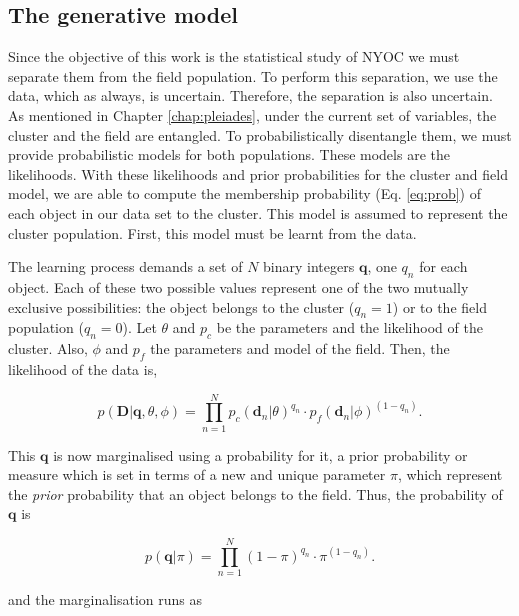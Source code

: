 \subsection{The generative model}
\label{subsect:generative-model}
Since the objective of this work is the statistical study of NYOC we must separate them from the field population. To perform this separation, we use the data, which as always, is uncertain. Therefore, the separation is also uncertain. As mentioned in Chapter \ref{chap:pleiades}, under the current set of variables, the cluster and the field are entangled. To probabilistically disentangle them, we must provide probabilistic models for both populations. These models are the likelihoods. With these likelihoods and prior probabilities for the cluster and field model, we are able to compute the membership probability (Eq. \ref{eq:prob}) of each object in our data set to the cluster. This model is assumed to represent the cluster population. First, this model must be learnt from the data.  

The learning process demands a set of $N$ binary integers $\mathbf{q}$, one $q_n$ for each object. Each of these two possible values represent one of the two mutually exclusive possibilities: the object belongs to the cluster ($q_n=1$) or to the field population ($q_n=0$). Let $\theta$ and $p_c$ be the parameters and the likelihood of the cluster. Also, $\phi$ and $p_f$ the parameters and model of the field. Then, the likelihood of the data is,

\begin{equation}
p(\mathbf{D}|\mathbf{q},\theta,\phi)= \prod_{n=1}^N {p_c(\mathbf{d}_n|\theta)}^{q_n}\cdot {p_f(\mathbf{d}_n|\phi)}^{(1-q_n)}.
\end{equation}

This $\mathbf{q}$ is now marginalised using a probability for it, a prior probability or measure which is set in terms of a new and unique parameter $\pi$, which represent the \emph{prior} probability that an object belongs to the field. Thus, the probability of $\mathbf{q}$ is

\begin{equation}
p(\mathbf{q}|\pi)= \prod_{n=1}^N {(1-\pi)}^{q_n}\cdot {\pi}^{(1-q_n)}.
\end{equation}

and the marginalisation runs as


